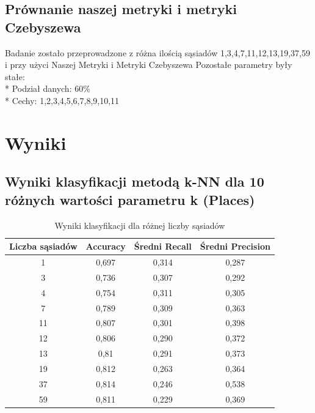 \documentclass{classrep}
\begin{document}
{\subsection{Prównanie naszej metryki i metryki Czebyszewa}
Badanie zostało przeprowadzone z różna ilością sąsiadów {1,3,4,7,11,12,13,19,37,59} i przy użyci Naszej Metryki i Metryki Czebyszewa
Pozostałe parametry były stałe:
\\*
Podział danych: 60\%
\\*
Cechy: 1,2,3,4,5,6,7,8,9,10,11
}

\section{Wyniki}
{
\subsection{Wyniki klasyfikacji metodą k-NN dla 10 różnych wartości parametru k (Places)}

\begin{table}[h]
\begin{center}
\caption{Wyniki klasyfikacji dla różnej liczby sąsiadów}
\begin{tabular}{|c|c|c|c|}
\hline
\textbf{Liczba sąsiadów} & \textbf{Accuracy} & \textbf{Średni Recall} & \textbf{Średni Precision} \\ \hline
1                        & 0,697             & 0,314                  & 0,287             \\ \hline
3                        & 0,736             & 0,307                  & 0,292             \\ \hline
4                        & 0,754             & 0,311                  & 0,305             \\ \hline
7                        & 0,789             & 0,309                  & 0,363             \\ \hline
11                       & 0,807             & 0,301                  & 0,398             \\ \hline
12                       & 0,806             & 0,290                  & 0,372             \\ \hline
13                       & 0,81              & 0,291                  & 0,373             \\ \hline
19                       & 0,812             & 0,263                  & 0,364             \\ \hline
37                       & 0,814             & 0,246                  & 0,538             \\ \hline
59                       & 0,811             & 0,229                  & 0,369             \\ \hline
\end{tabular}
\end{center}
\end{table}

}
\end{document}
